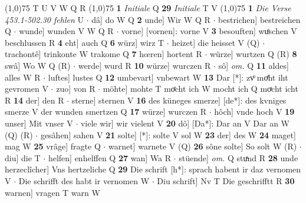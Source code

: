 \documentclass[8pt,a4paper,notitlepage]{article}
\begin{document}
\begin{table}[ht]
\begin{minipage}[t]{0.5\linewidth}
\begin{tabular}{rl}
\end{tabular}
\scriptsize
\line(1,0){75} \newline
T U V W Q R \newline
\line(1,0){75} \newline
\textbf{1} \textit{Initiale} Q  \textbf{29} \textit{Initiale} T V  \newline
\line(1,0){75} \newline
\textbf{1} \textit{Die Verse 453.1-502.30 fehlen} U   $\cdot$ dâ] do W Q \textbf{2} unde] Wir W Q R  $\cdot$ bestrichen] bestreichen Q  $\cdot$ wunde] wunden V W Q R  $\cdot$ vorne] [vornen]: vorne V \textbf{3} besouften] wuͦschen V beschlussen R \textbf{4} eht] auch Q \textbf{6} würz] wirz T  $\cdot$ heizet] die heisset V (Q)  $\cdot$ trachontê] trinkonte W trakome Q \textbf{7} hœren] hortent R  $\cdot$ würze] wurtzen Q (R) \textbf{8} swâ] Wo W Q (R)  $\cdot$ werde] wurd R \textbf{10} würze] wurczen R  $\cdot$ sô] \textit{om.} Q \textbf{11} aldes] alles W R  $\cdot$ luftes] lustes Q \textbf{12} umbevart] vnbewart W \textbf{13} Dar [*]: zvͦ moͤht iht gevromen V  $\cdot$ zuo] von R  $\cdot$ möhte] mohte T moͤcht ich W mocht ich Q moͯcht icht R \textbf{14} der] den R  $\cdot$ sterne] sternen V \textbf{16} des küneges smerze] [de*]: des kvniges smerze V der wunden smertzen Q \textbf{17} würze] wurczen R  $\cdot$ hôch] vnde hoch V \textbf{19} unser] Mit vnser V  $\cdot$ viele wir] wir vielent V \textbf{20} dô] [Da*]: Dar an V Dar an W (Q) (R)  $\cdot$ gesâhen] sahen V \textbf{21} solte] [*]: solte V sol W \textbf{23} der] des W \textbf{24} maget] mag W \textbf{25} vrâge] fragte Q  $\cdot$ warnet] warnete V (Q) \textbf{26} sône solte] So solt W (R)  $\cdot$ diu] die T  $\cdot$ helfen] enhelffen Q \textbf{27} wan] Wa R  $\cdot$ stüende] \textit{om.} Q stuͯnd R \textbf{28} unde herzeclîcher] Vns hertzeliche Q \textbf{29} Die schrift [h*]: sprach habent ir daz vernomen V  $\cdot$ Die schrifft des habt ir vernomen W  $\cdot$ Diu schrift] Nv T Die geschrifftt R \textbf{30} warnen] vragen T warn W \newline
\end{minipage}
\end{table}
\end{document}
